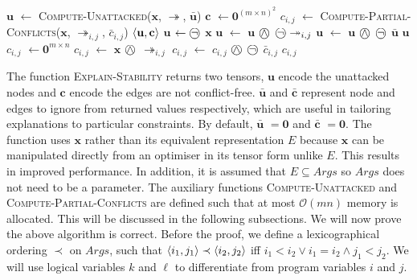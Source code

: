 \begin{algorithm}[H]
	\caption{}
	\begin{algorithmic}[1]
			\State $\mathbf{u}$ $\gets$ \textsc{Compute-Unattacked}($\mathbf{x}$, $\twoheadrightarrow$, $\bar{\mathbf{u}}$)
			\State $\mathbf{c}$ $\gets\mathbf{0}^{(m\times n)^2}$
					\State $c_{i,j}$ $\gets$ \textsc{Compute-Partial-Conflicts}($\mathbf{x}$, $\twoheadrightarrow_{i,j}$, $\bar{c}_{i,j}$)
				\EndFor
			\EndFor			
			\State \Return $\langle{\mathbf{u}},{\mathbf{c}}\rangle$
		\EndFunction
			\State $\mathbf{u}$ $\gets\incircbin{\neg}$ $\mathbf{x}$
						\State $\mathbf{u}$ $\gets$ $\mathbf{u}$ $\incircbin{\land}$ $\incircbin{\neg}\twoheadrightarrow_{i,j}$
					\EndIf
				\EndFor
			\EndFor
			\State $\mathbf{u}$ $\gets$ $\mathbf{u}$ $\incircbin{\land}$ $\incircbin{\neg}$ $\bar{\mathbf{u}}$
			\State \Return $\mathbf{u}$
		\EndFunction
			\State $c_{i,j}$ $\gets\mathbf{0}^{m\times n}$
				\State $c_{i,j}$ $\gets$ $\mathbf{x}$ $\incircbin{\land}$ $\twoheadrightarrow_{i,j}$ 
			\EndIf
			\State $c_{i,j}$ $\gets$ $c_{i,j}$ $\incircbin{\land}$ $\incircbin{\neg}$ $\bar{c}_{i,j}$
			\State \Return $c_{i,j}$
		\EndFunction
	\end{algorithmic}
\end{algorithm}

The function \textsc{Explain-Stability} returns two tensors, $\mathbf{u}$ encode the unattacked nodes and $\mathbf{c}$ encode the edges are not conflict-free. $\bar{\mathbf{u}}$ and $\bar{\mathbf{c}}$ represent node and edges to ignore from returned values respectively, which are useful in tailoring explanations to particular constraints. By default, $\bar{\mathbf{u}}$ $=\mathbf{0}$ and $\bar{\mathbf{c}}$ $=\mathbf{0}$. The function uses $\mathbf{x}$ rather than its equivalent representation $E$ because $\mathbf{x}$ can be manipulated directly from an optimiser in its tensor form unlike $E$. This results in improved performance. In addition, it is assumed that $E\subseteq Args$ so $Args$ does not need to be a parameter.
\linespace
The auxiliary functions \textsc{Compute-Unattacked} and \textsc{Compute-Partial-Conflicts} are defined such that at most $\mathcal{O}(mn)$ memory is allocated. This will be discussed in the following subsections. We will now prove the above algorithm is correct.
\linespace
Before the proof, we define a lexicographical ordering $\prec$ on $Args$, such that $\langle{i_1},{j_1}\rangle\prec\langle{i_2},{j_2}\rangle$ iff $i_1<i_2\lor i_1=i_2\land j_1<j_2$. We will use logical variables $k$ and $\ell$ to differentiate from program variables $i$ and $j$.

